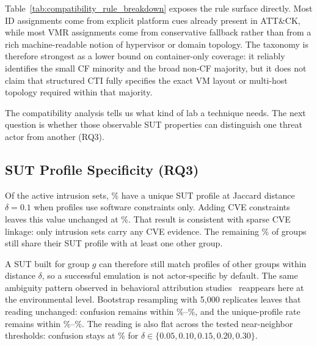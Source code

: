 \documentclass[sigconf]{acmart}
\begin{document}
Table~\ref{tab:compatibility_rule_breakdown} exposes the rule surface directly. Most ID assignments come from explicit platform cues already present in ATT\&CK, while most VMR assignments come from conservative fallback rather than from a rich machine-readable notion of hypervisor or domain topology. The taxonomy is therefore strongest as a lower bound on container-only coverage: it reliably identifies the small CF minority and the broad non-CF majority, but it does not claim that structured CTI fully specifies the exact VM layout or multi-host topology required within that majority.

The compatibility analysis tells us what kind of lab a technique needs. The next question is whether those observable SUT properties can distinguish one threat actor from another (RQ3).

\subsection{SUT Profile Specificity (RQ3)}

Of the \enterpriseactiveintrusionsetcount{} active intrusion sets, \sutprofileuniquesoftwarepercentage\% have a unique SUT profile at Jaccard distance $\delta = 0.1$ when profiles use software constraints only. Adding CVE constraints leaves this value unchanged at \sutprofileuniquesoftwarecvepercentage\%. That result is consistent with sparse CVE linkage: only \entintrusionsetswithcvecount{} intrusion sets carry any CVE evidence. The remaining \sutprofileconfusionsoftwarecvepercentage\% of groups still share their SUT profile with at least one other group.

A SUT built for group $g$ can therefore still match profiles of other groups within distance $\delta$, so a successful emulation is not actor-specific by default. The same ambiguity pattern observed in behavioral attribution studies~\cite{DBLP:conf/uss/SahaMBCVL25} reappears here at the environmental level. Bootstrap resampling with 5{,}000 replicates leaves that reading unchanged: confusion remains within \bootstrapconfusioncilow{}\%--\bootstrapconfusioncihigh{}\%, and the unique-profile rate remains within \bootstrapuniquecilow{}\%--\bootstrapuniquecihigh{}\%. The reading is also flat across the tested near-neighbor thresholds: confusion stays at \deltazerozerofiveconfusionpct{}\% for $\delta \in \{0.05, 0.10, 0.15, 0.20, 0.30\}$.
\end{document}
